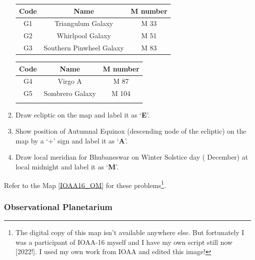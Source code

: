 \documentclass[a4paper,12pt]{extarticle}
\begin{document}
\begin{enumerate}
 \begin{table}[h]
 	\centering
 	\begin{minipage}{0.45\textwidth}
 		\centering
 		\begin{tabular}{|c|c|c|}
 			\hline
 			\textbf{Code} & \textbf{Name} & \textbf{M number} \\
 			\hline
 			G1 & Triangulum Galaxy & M 33 \\
 			G2 & Whirlpool Galaxy & M 51 \\
 			G3 & Southern Pinwheel Galaxy & M 83 \\
 			\hline
 		\end{tabular}
 	\end{minipage}
 	\hspace{0.04\textwidth}
 	\begin{minipage}{0.45\textwidth}
 		\centering
 		\begin{tabular}{|c|c|c|}
 			\hline
 			\textbf{Code} & \textbf{Name} & \textbf{M number} \\
 			\hline
 			G4 & Virgo A & M 87 \\
 			G5 & Sombrero Galaxy & M 104 \\
 			&  &  \\
 			\hline
 		\end{tabular}
 	\end{minipage}
 \end{table}
\item Draw ecliptic on the map and label it as ‘\textbf{E}’.
\item Show position of Autumnal Equinox (descending node of the ecliptic) on the map by a ‘+’ sign and label it as ‘\textbf{A}’.
\item Draw local meridian for Bhubaneswar on Winter Solstice day ( December) at local midnight and label it as ‘\textbf{M}’.
\end{enumerate}

Refer to the Map \ref{IOAA16_OM} for these problems\footnote{The digital copy of this map isn't available anywhere else. But fortunately I was a participant of IOAA-16 myself and I have my own script still now [2022!]. I used my own work from IOAA and edited this image!}. 

\subsubsection{Observational Planetarium}
\end{document}

